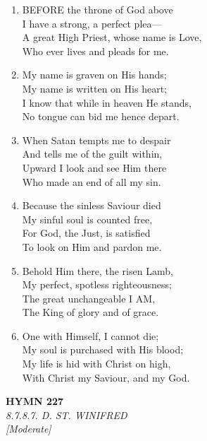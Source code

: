\documentclass[11pt,a4paper]{article}
\begin{document}
\begin{enumerate}
    \item BEFORE the throne of God above \\
        I have a strong, a perfect plea--- \\
        A great High Priest, whose name is Love, \\
        Who ever lives and pleads for me.

    \item My name is graven on His hands; \\
        My name is written on His heart; \\
        I know that while in heaven He stands, \\
        No tongue can bid me hence depart.

    \item When Satan tempts me to despair \\
        And tells me of the guilt within, \\
        Upward I look and see Him there \\
        Who made an end of all my sin.

    \item Because the sinless Saviour died \\
        My sinful soul is counted free, \\
        For God, the Just, is satisfied \\
        To look on Him and pardon me.

    \item Behold Him there, the risen Lamb, \\
        My perfect, spotless righteousness; \\
        The great unchangeable I AM, \\
        The King of glory and of grace.

    \item One with Himself, I cannot die; \\
        My soul is purchased with His blood; \\
        My life is hid with Christ on high, \\
        With Christ my Saviour, and my God.

\end{enumerate}

\newpage
\begin{center}
    {\Large \textbf{HYMN 227}}
    \\
    \textit{8.7.8.7. D. ST. WINIFRED}
    \\
    \textit{\small [Moderate]}
\end{center}
\vspace{1em}
\end{document}
